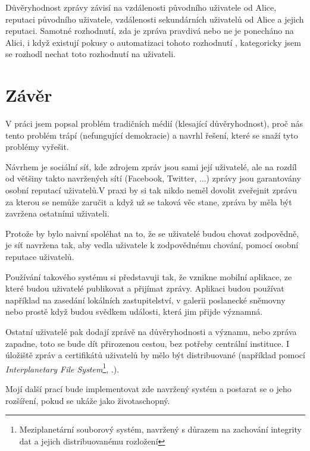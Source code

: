 \documentclass{report}
\begin{document}
Důvěryhodnost zprávy závisí na vzdálenosti původního uživatele od Alice, reputaci původního uživatele, vzdálenosti sekundárních uživatelů od Alice a jejich reputaci. Samotné rozhodnutí, zda je zpráva pravdivá nebo ne je ponecháno na Alici, i když existují pokusy o automatizaci tohoto rozhodnutí \citep{giasemidis16}, kategoricky jsem se rozhodl nechat toto rozhodnutí na uživateli.

\chapter{Závěr}
\label{ch:zaver}

V práci jsem popsal problém tradičních médií (klesající důvěryhodnost), proč nás tento problém trápí (nefungující demokracie) a navrhl řešení, které se snaží tyto problémy vyřešit.

Návrhem je sociální síť, kde zdrojem zpráv jsou sami její uživatelé, ale na rozdíl od většiny takto navržených sítí (Facebook, Twitter, ...) zprávy jsou garantovány osobní reputací uživatelů.V praxi by si tak nikdo neměl dovolit zveřejnit zprávu za kterou se nemůže zaručit a když už se taková věc stane, zpráva by měla být zavržena ostatními uživateli.

Protože by bylo naivní spoléhat na to, že se uživatelé budou chovat zodpovědně, je síť navržena tak, aby vedla uživatele k zodpovědnému chování, pomocí osobní reputace uživatelů.

Používání takového systému si představuji tak, že vznikne mobilní aplikace, ze které budou uživatelé publikovat a přijímat zprávy. Aplikaci budou používat například na zasedání lokálních zastupitelství, v galerii poslanecké sněmovny nebo prostě když budou svědkem události, která jim přijde významná.

Ostatní uživatelé pak dodají zprávě na důvěryhodnosti a významu, nebo zpráva zapadne, toto se bude dít přirozenou cestou, bez potřeby centrální instituce. I úložiště zpráv a certifikátů uživatelů by mělo být distribuované (například pomocí \textit{Interplanetary File System}\footnote{Meziplanetární souborový systém, navržený s důrazem na zachování integrity dat a jejich distribuovanému rozložení}, \cite{benet14}.).

Mojí další prací bude implementovat zde navržený systém a postarat se o jeho rozšíření, pokud se ukáže jako životaschopný.

\printglossaries
\printbibliography[heading=bibintoc]
\end{document}

